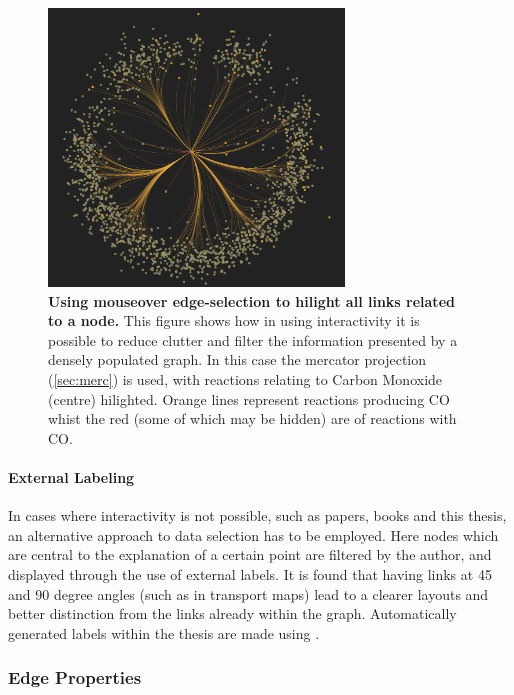 \begin{figure}[H]
     \centering
     \includegraphics[width=0.7\textwidth]{figures_c1/layout/CObranches.png}
        \caption{\textbf{Using mouseover edge-selection to hilight all links related to a node. } This figure shows how in using interactivity it is possible to reduce clutter and filter the information presented by a densely populated graph. In this case the mercator projection (\autoref{sec:merc}) is used, with reactions relating to Carbon Monoxide (centre) hilighted. Orange lines represent reactions producing CO whist the red (some of which may be hidden) are of reactions with CO.  }
      \label{fig:tooltip}
\end{figure}

\paragraph*{\color{c5}External Labeling}
In cases where interactivity is not possible, such as papers, books and this thesis, an alternative approach to data selection has to be employed. Here nodes which are central to the explanation of a certain point are filtered by the author, and displayed through the use of external labels. It is found that having links at 45 and 90 degree angles (such as in transport maps) lead to a clearer layouts and better distinction from the links already within the graph. Automatically generated labels within the thesis are made using \citep{d3annotate}.







\subsubsection{Edge Properties}


